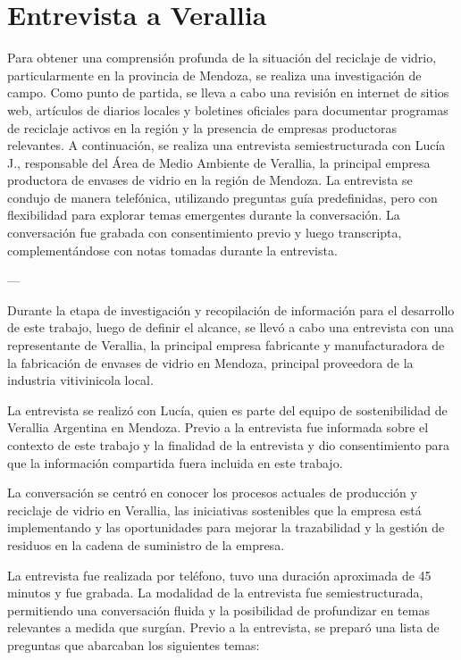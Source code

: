 \chapter{Entrevista a Verallia}
\label{cp:verallia-interview}

\parindent0pt


Para obtener una comprensión profunda de la situación del reciclaje de vidrio, particularmente en la provincia de Mendoza, se realiza una investigación de campo.
Como punto de partida, se lleva a cabo una revisión en internet de sitios web, artículos de diarios locales y boletines oficiales para documentar programas de reciclaje activos en la región y la presencia de empresas productoras relevantes.
A continuación, se realiza una entrevista semiestructurada con Lucía J., responsable del Área de Medio Ambiente de Verallia, la principal empresa productora de envases de vidrio en la región de Mendoza.
La entrevista se condujo de manera telefónica, utilizando preguntas guía predefinidas, pero con flexibilidad para explorar temas emergentes durante la conversación.
La conversación fue grabada con consentimiento previo y luego transcripta, complementándose con notas tomadas durante la entrevista.

---

Durante la etapa de investigación y recopilación de información para el desarrollo de este trabajo, luego de definir el alcance, se llevó a cabo una entrevista con una representante de Verallia, la principal empresa fabricante y manufacturadora de la fabricación de envases de vidrio en Mendoza, principal proveedora de la industria vitivinicola local.

La entrevista se realizó con Lucía, quien es parte del equipo de sostenibilidad de Verallia Argentina en Mendoza. Previo a la entrevista fue informada sobre el contexto de este trabajo y la finalidad de la entrevista y dio consentimiento para que la información compartida fuera incluida en este trabajo. 

La conversación se centró en conocer los procesos actuales de producción y reciclaje de vidrio en Verallia, las iniciativas sostenibles que la empresa está implementando y las oportunidades para mejorar la trazabilidad y la gestión de residuos en la cadena de suministro de la empresa.

La entrevista fue realizada por teléfono, tuvo una duración aproximada de 45 minutos y fue grabada. La modalidad de la entrevista fue semiestructurada, permitiendo una conversación fluida y la posibilidad de profundizar en temas relevantes a medida que surgían. Previo a la entrevista, se preparó una lista de preguntas que abarcaban los siguientes temas:

